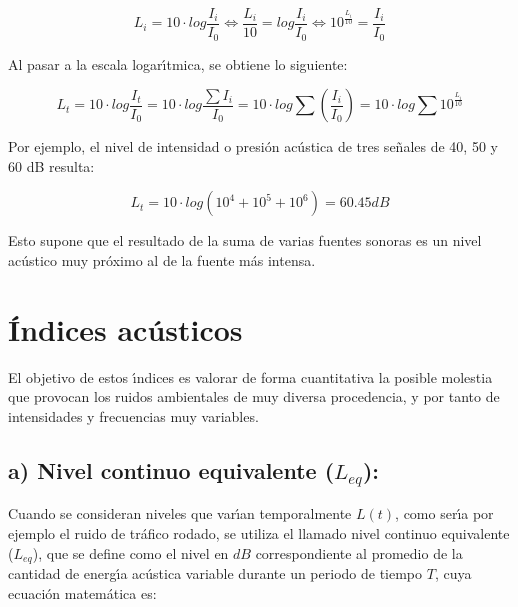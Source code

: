 \documentclass[a4paper,12pt]{article}
\begin{document}
\begin{equation}
L_i = 10 \cdot log\frac{I_i}{I_0} \Leftrightarrow \frac{L_i}{10}= log\frac{I_i}{I_0}  
\Leftrightarrow 10^{\frac{L_i}{10}}=\frac{I_i}{I_0}
\end{equation}

Al pasar a la escala logar\'{\i}tmica, se obtiene lo siguiente:



\begin{equation}
L_t= 10 \cdot log\frac{I_t}{I_0}=10 \cdot log \frac{\sum{I_i}}{I_0}=
10 \cdot log \sum(\frac{I_i}{I_0})= 10 \cdot log \sum 10^\frac{L_i}{10}
\end{equation}


Por ejemplo, el nivel de intensidad o presi\'on ac\'ustica de tres se\~nales de 
40, 50 y 60 dB resulta:

\begin{equation}
L_t=10 \cdot log(10^4+10^5+10^6)=60.45 dB
\end{equation}

Esto supone que el resultado de la suma de varias fuentes sonoras es un nivel 
ac\'ustico muy pr\'oximo al de la fuente m\'as intensa.


\section*{\'Indices ac\'usticos}

El objetivo de estos \'{\i}ndices es valorar de forma cuantitativa la posible 
molestia que provocan los ruidos ambientales de muy diversa procedencia, y por 
tanto de intensidades y frecuencias muy variables.

\subsection*{a) Nivel continuo equivalente ($L_{eq}$):}

Cuando se consideran niveles que var\'{\i}an temporalmente $L(t)$, como ser\'{\i}a 
por ejemplo el ruido de tr\'afico rodado, se utiliza el llamado nivel continuo 
equivalente ($L_{eq}$), que se define como el nivel en $dB$ correspondiente al promedio de 
la cantidad de energ\'{\i}a ac\'ustica variable durante un periodo de tiempo 
$T$, cuya ecuaci\'on matem\'atica es:
\end{document}
